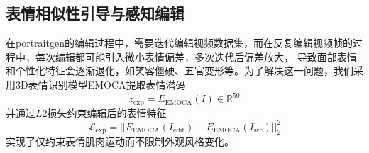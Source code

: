 \subsection{表情相似性引导与感知编辑}

在portraitgen的编辑过程中，需要迭代编辑视频数据集，而在反复编辑视频帧的过程中，每次编辑都可能引入微小表情偏差，多次迭代后偏差放大，
导致面部表情和个性化特征会逐渐退化，如笑容僵硬、五官变形等。为了解决这一问题，我们采用3D表情识别模型EMOCA提取表情潜码
\begin{equation}
    z_{\text{exp}}=E_{\text{EMOCA}}(I) \in \mathbb{R} ^{50}
\end{equation}
并通过$L2$损失约束编辑后的表情特征
\begin{equation}
    \mathcal{L}_{\text{exp}}=||E_{\text{EMOCA}}(I_{\text{edit}})-E_{\text{EMOCA}}(I_{\text{src}})||_2^2
\end{equation}
实现了仅约束表情肌肉运动而不限制外观风格变化。

